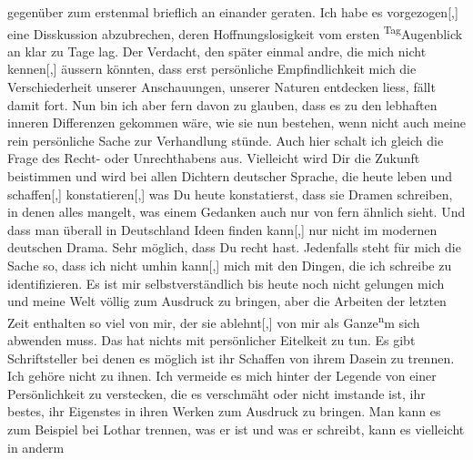                gegenüber zum erstenmal brieflich an einander geraten. Ich habe es
                  vorgezogen{[},{]} eine Disskussion abzubrechen, deren
               Hoffnungslosigkeit vom ersten \substVorne{}\textsuperscript{Tag}\substDazwischen{}Augenblick\substHinten{} an klar zu Tage lag. Der Verdacht, den später einmal andre, die mich nicht
                  kennen{[},{]} äussern könnten, dass erst persönliche
               Empfindlichkeit mich die Verschiederheit unserer Anschauungen\introOben{},\introOben{} unserer Naturen entdecken liess, fällt damit fort. Nun bin ich aber fern
               davon zu glauben, dass es zu den lebhaften inneren Differenzen gekommen wäre, wie sie
               nun bestehen, wenn nicht auch meine rein persönliche Sache zur Verhandlung stünde.
               Auch hier schalt ich gleich die Frage des Recht- oder Unrechthabens aus. Vielleicht
               wird Dir die Zukunft beistimmen und wird bei allen Dichtern deutscher Sprache, die
               heute leben und schaffen{[},{]} konstatieren{[},{]} was
               Du heute konstatierst, dass sie Dramen schreiben, in denen alles mangelt, {\pb}was einem Gedanken auch nur von fern
               ähnlich sieht. Und dass man überall in Deutschland Ideen finden kann{[},{]} nur nicht im modernen
               deutschen Drama. Sehr möglich, dass Du recht hast. Jedenfalls steht für mich die
               Sache so, dass ich nicht umhin kann{[},{]} mich mit den Dingen, die
               ich schreibe zu identifizieren. Es ist mir selbstverständlich bis heute noch nicht
               gelungen mich und meine Welt völlig zum Ausdruck zu bringen, aber die Arbeit\introOben{}en\introOben{} der letzten Zeit enthalten so viel von mir, \label{T_L03520-4v}\label{T_L03520-4} der sie
                  ablehnt{[},{]} von mir als Ganze\substVorne{}\textsuperscript{n}\substDazwischen{}m\substHinten{} sich abwenden muss. Das hat nichts mit persönlicher Eitelkeit zu tun. Es
               gibt Schriftsteller bei denen es möglich ist ihr Schaffen von ihrem Dasein zu
               trennen. Ich gehöre nicht zu ihnen. Ich vermeide es mich hinter der Legende von einer
               Persönlichkeit zu verstecken, die es verschmäht oder nicht imstande ist, ihr bestes,
               ihr Eigenstes in ihren Werken zum Ausdruck zu bringen. Man kann es zum Beispiel {\pb}bei Lothar trennen, was er ist und was er schreibt, kann es vielleicht in anderm
